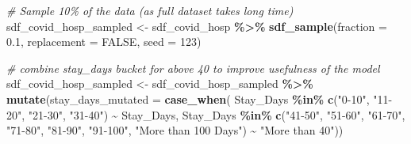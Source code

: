 \documentclass[
]{article}
\newenvironment{Shaded}{\begin{snugshade}}{\end{snugshade}}
\newcommand{\AttributeTok}[1]{\textcolor[rgb]{0.13,0.29,0.53}{#1}}
\newcommand{\CommentTok}[1]{\textcolor[rgb]{0.56,0.35,0.01}{\textit{#1}}}
\newcommand{\ConstantTok}[1]{\textcolor[rgb]{0.56,0.35,0.01}{#1}}
\newcommand{\DecValTok}[1]{\textcolor[rgb]{0.00,0.00,0.81}{#1}}
\newcommand{\FloatTok}[1]{\textcolor[rgb]{0.00,0.00,0.81}{#1}}
\newcommand{\FunctionTok}[1]{\textcolor[rgb]{0.13,0.29,0.53}{\textbf{#1}}}
\newcommand{\NormalTok}[1]{#1}
\newcommand{\OtherTok}[1]{\textcolor[rgb]{0.56,0.35,0.01}{#1}}
\newcommand{\SpecialCharTok}[1]{\textcolor[rgb]{0.81,0.36,0.00}{\textbf{#1}}}
\newcommand{\StringTok}[1]{\textcolor[rgb]{0.31,0.60,0.02}{#1}}
\begin{document}
\begin{Shaded}
\begin{Highlighting}[]
\CommentTok{\# Sample 10\% of the data (as full dataset takes long time)}
\NormalTok{sdf\_covid\_hosp\_sampled }\OtherTok{\textless{}{-}}\NormalTok{ sdf\_covid\_hosp }\SpecialCharTok{\%\textgreater{}\%}
  \FunctionTok{sdf\_sample}\NormalTok{(}\AttributeTok{fraction =} \FloatTok{0.1}\NormalTok{, }\AttributeTok{replacement =} \ConstantTok{FALSE}\NormalTok{, }\AttributeTok{seed =} \DecValTok{123}\NormalTok{)}

\CommentTok{\# combine stay\_days bucket for above 40 to improve usefulness of the model}
\NormalTok{sdf\_covid\_hosp\_sampled }\OtherTok{\textless{}{-}}\NormalTok{ sdf\_covid\_hosp\_sampled }\SpecialCharTok{\%\textgreater{}\%}
  \FunctionTok{mutate}\NormalTok{(}\AttributeTok{stay\_days\_mutated =} \FunctionTok{case\_when}\NormalTok{(}
\NormalTok{    Stay\_Days }\SpecialCharTok{\%in\%} \FunctionTok{c}\NormalTok{(}\StringTok{"0{-}10"}\NormalTok{, }\StringTok{"11{-}20"}\NormalTok{, }\StringTok{"21{-}30"}\NormalTok{, }\StringTok{"31{-}40"}\NormalTok{) }\SpecialCharTok{\textasciitilde{}}\NormalTok{ Stay\_Days,}
\NormalTok{    Stay\_Days }\SpecialCharTok{\%in\%} \FunctionTok{c}\NormalTok{(}\StringTok{"41{-}50"}\NormalTok{, }\StringTok{"51{-}60"}\NormalTok{, }\StringTok{"61{-}70"}\NormalTok{, }\StringTok{"71{-}80"}\NormalTok{, }\StringTok{"81{-}90"}\NormalTok{, }\StringTok{"91{-}100"}\NormalTok{, }\StringTok{"More than 100 Days"}\NormalTok{) }\SpecialCharTok{\textasciitilde{}} \StringTok{"More than 40"}\NormalTok{))}


\end{Highlighting}
\end{Shaded}
\end{document}
